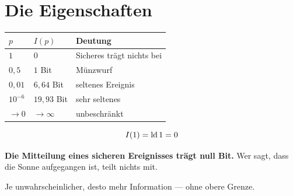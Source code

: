 \section{Die Eigenschaften}

\begin{merksatz}
\begin{center}
{\small
\renewcommand{\arraystretch}{1.5}
\begin{tabular}{@{}P{2.4cm}P{2.6cm}P{3.0cm}@{}}
\toprule
$p$ & $I(p)$ & \textbf{Deutung}\\
\midrule
$1$ & $0$ & Sicheres trägt nichts bei\\
$0{,}5$ & $1$ Bit & Münzwurf\\
$0{,}01$ & $6{,}64$ Bit & seltenes Ereignis\\
$10^{-6}$ & $19{,}93$ Bit & sehr seltenes\\
$\to 0$ & $\to\infty$ & unbeschränkt\\
\bottomrule
\end{tabular}}
\end{center}

\[ I(1) = \operatorname{ld} 1 = 0 \]

\begin{center}
\begin{minipage}{0.9\textwidth}
\textbf{Die Mitteilung eines sicheren Ereignisses trägt null Bit.} Wer sagt, dass die Sonne aufgegangen ist, teilt nichts mit.
\end{minipage}
\end{center}

Je unwahrscheinlicher, desto mehr Information --- ohne obere Grenze.

\begin{center}
\begin{minipage}{0.88\textwidth}
\end{minipage}
\end{center}
\end{merksatz}

